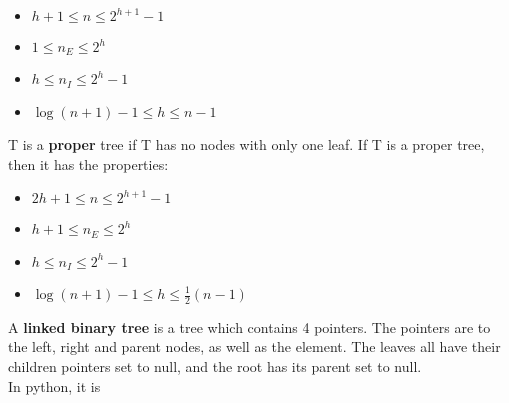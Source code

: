 \documentclass[]{article}
\begin{document}
\begin{itemize}
	\item $h+1 \leq n \leq 2^{h+1} - 1$
	\item $1 \leq n_E \leq 2^h$
	\item $h \leq n_I \leq 2^h - 1$
	\item $\log(n+1) - 1 \leq h \leq n - 1$
\end{itemize}\bigbreak

T is a \textbf{proper} tree if T has no nodes with only one leaf. If T is a proper tree, then it has the properties:

\begin{itemize}
	\item $2h+1 \leq n \leq 2^{h+1} - 1$
	\item $h+1 \leq n_E \leq 2^h$ 
	\item $h \leq n_I \leq 2^h - 1$
	\item $\log(n+1) - 1 \leq h \leq \frac{1}{2}(n - 1)$
\end{itemize}\bigbreak

A \textbf{linked binary tree} is a tree which contains 4 pointers. The pointers are to the left, right and parent nodes, as well as the element. The leaves all have their children pointers set to null, and the root has its parent set to null.\\

In python, it is\\
\end{document}
